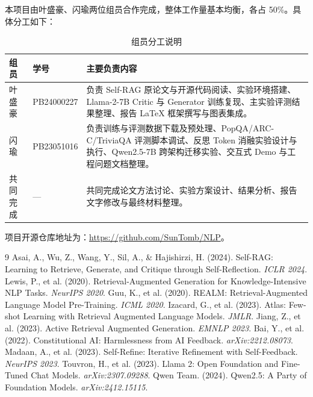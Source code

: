 \documentclass[11pt,a4paper]{article}
\begin{document}
本项目由叶盛豪、闪瑜两位组员合作完成，整体工作量基本均衡，各占 50\%。具体分工如下：

\begin{table}[H]
\centering
\caption{组员分工说明}
\label{tab:contribution}
\begin{tabular}{p{2.8cm}p{2.8cm}p{8cm}}
\toprule
组员 & 学号 & 主要负责内容 \\
\midrule
叶盛豪 & PB24000227 & 负责 Self-RAG 原论文与开源代码阅读、实验环境搭建、Llama-2-7B Critic 与 Generator 训练复现、主实验评测结果整理、报告 LaTeX 框架撰写与图表集成。 \\
\midrule
闪瑜 & PB23051016 & 负责训练与评测数据下载及预处理、PopQA/ARC-C/TriviaQA 评测脚本调试、反思 Token 消融实验设计与执行、Qwen2.5-7B 跨架构迁移实验、交互式 Demo 与工程问题文档整理。 \\
\midrule
共同完成 & --- & 共同完成论文方法讨论、实验方案设计、结果分析、报告文字修改与最终材料整理。 \\
\bottomrule
\end{tabular}
\end{table}

项目开源仓库地址为：\url{https://github.com/SunTomb/NLP}。

\begin{thebibliography}{9}
 Asai, A., Wu, Z., Wang, Y., Sil, A., \& Hajishirzi, H. (2024). Self-RAG: Learning to Retrieve, Generate, and Critique through Self-Reflection. \textit{ICLR 2024}.
 Lewis, P., et al. (2020). Retrieval-Augmented Generation for Knowledge-Intensive NLP Tasks. \textit{NeurIPS 2020}.
 Guu, K., et al. (2020). REALM: Retrieval-Augmented Language Model Pre-Training. \textit{ICML 2020}.
 Izacard, G., et al. (2023). Atlas: Few-shot Learning with Retrieval Augmented Language Models. \textit{JMLR}.
 Jiang, Z., et al. (2023). Active Retrieval Augmented Generation. \textit{EMNLP 2023}.
 Bai, Y., et al. (2022). Constitutional AI: Harmlessness from AI Feedback. \textit{arXiv:2212.08073}.
 Madaan, A., et al. (2023). Self-Refine: Iterative Refinement with Self-Feedback. \textit{NeurIPS 2023}.
 Touvron, H., et al. (2023). Llama 2: Open Foundation and Fine-Tuned Chat Models. \textit{arXiv:2307.09288}.
 Qwen Team. (2024). Qwen2.5: A Party of Foundation Models. \textit{arXiv:2412.15115}.
\end{thebibliography}
\end{document}
